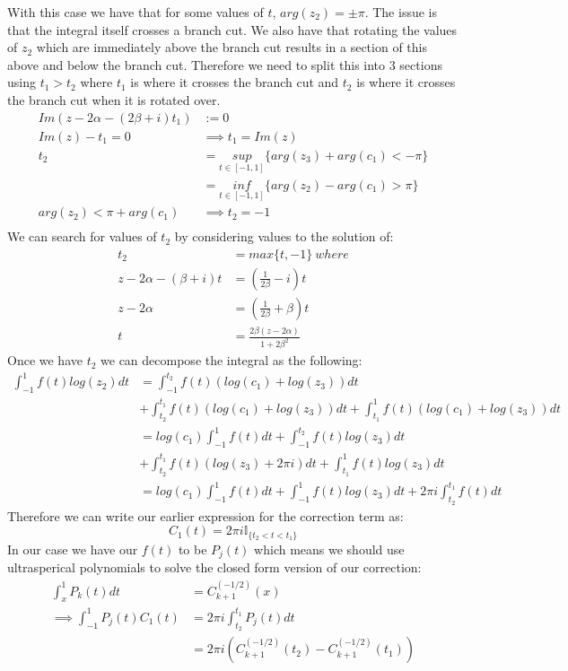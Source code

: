 \documentclass{article}
\begin{document}
With this case we have that for some values of $t$, $arg(z_2)=\pm \pi$.
The issue is that the integral itself crosses a branch cut.
We also have that rotating the values of $z_2$ which are immediately above the branch cut results in a section of this above and below the branch cut.
Therefore we need to split this into 3 sections using $t_1>t_2$ where $t_1$ is where it crosses the branch cut and $t_2$ is where it crosses the branch cut when it is rotated over.
\begin{align}
    Im(z-2\alpha-(2\beta+i)t_1)&:=0\\
    Im(z)-t_1=0 &\implies t_1 = Im(z)\\
    t_2&=\underset{t\in[-1,1]}{sup}\{arg(z_3)+arg(c_1)<-\pi\}\\
    &=\underset{t\in[-1,1]}{inf}\{arg(z_2)-arg(c_1)>\pi\}\\
    arg(z_2)<\pi+arg(c_1) &\implies t_2=-1\\
\end{align}
We can search for values of $t_2$ by considering values to the solution of:
\begin{align}
    t_2&= max\{t,-1\} \: where\\
    z-2\alpha-(\beta+i)t&=(\frac{1}{2\beta}-i)t\\
    z-2\alpha&=(\frac{1}{2\beta}+\beta)t\\
    t&=\frac{2\beta(z-2\alpha)}{1+2\beta^2}
\end{align}
Once we have $t_2$ we can decompose the integral as the following:
\begin{align}
    \int_{-1}^1f(t)log(z_2)dt&=\int_{-1}^{t_2}f(t)(log(c_1)+log(z_3))dt\\
    &+\int_{t_2}^{t_1}f(t)(log(c_1)+log(z_3))dt+\int_{t_1}^1f(t)(log(c_1)+log(z_3))dt\\
    &=log(c_1)\int_{-1}^1f(t)dt+\int_{-1}^{t_2}f(t)log(z_3)dt\\
    &+\int_{t_2}^{t_1}f(t)(log(z_3)+2\pi i)dt+\int_{t_1}^1f(t)log(z_3)dt\\
    &=log(c_1)\int_{-1}^1f(t)dt+\int_{-1}^1f(t)log(z_3)dt+2\pi i\int_{t_2}^{t_1}f(t)dt
\end{align}
Therefore we can write our earlier expression for the correction term as:
$$C_1(t)=2\pi i\mathbb{I}_{\{t_2<t<t_1\}}$$
In our case we have our $f(t)$ to be $P_j(t)$ which means we should use ultrasperical polynomials to solve the closed form version of our correction:
\begin{align}
    \int_x^1P_k(t)dt&=C_{k+1}^{(-1/2)}(x)\\
    \implies \int_{-1}^1P_j(t)C_1(t)&=2\pi i\int_{t_2}^{t_1}P_j(t)dt\\
    &=2\pi i(C_{k+1}^{(-1/2)}(t_2)-C_{k+1}^{(-1/2)}(t_1))
\end{align}
\end{document}
